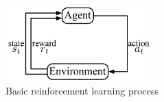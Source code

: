 
%
\begin{figure}[tb]
\begin{center}
\includegraphics[width = 0.5\textwidth]{figures/figures_introduction/RL_diagram.pdf}
\caption{Basic reinforcement learning process} 
\label{fig_chap1:RL_diagram}
\end{center}
\end{figure}
%

